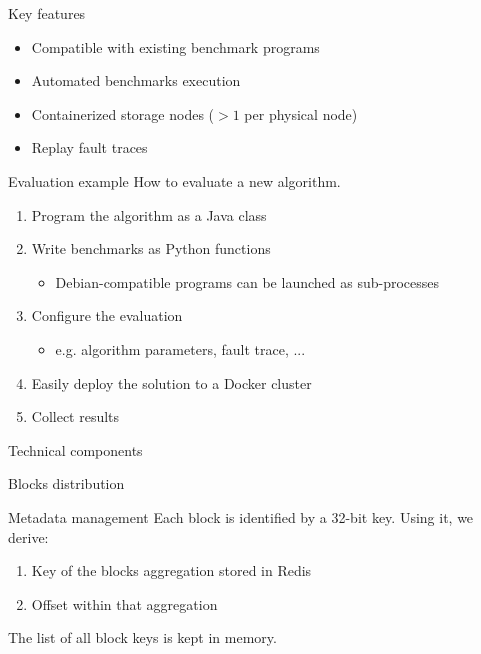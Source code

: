 \begin{frame}{Key features}
    \begin{itemize}
        \item Compatible with existing benchmark programs
        \item Automated benchmarks execution
        \item Containerized storage nodes ($>1$ per physical node)
        \item Replay fault traces
    \end{itemize}
\end{frame}

\begin{frame}{Evaluation example}
    How to evaluate a new algorithm.
    \begin{enumerate}
        \item Program the algorithm as a Java class
        \item Write benchmarks as Python functions
        \begin{itemize}
            \item Debian-compatible programs can be launched as sub-processes
        \end{itemize}
        \item Configure the evaluation
        \begin{itemize}
            \item e.g. algorithm parameters, fault trace, ...
        \end{itemize}
        \item Easily deploy the solution to a Docker cluster
        \item Collect results
    \end{enumerate}
\end{frame}

\subtitle[Architecture]{Architecture}

\begin{frame}{Technical components}
    \centering
    
\end{frame}

\begin{frame}{Blocks distribution}
    \centering
    
\end{frame}

\begin{frame}{Metadata management}
    Each block is identified by a 32-bit key.
    Using it, we derive:
    \begin{enumerate}
        \item Key of the blocks aggregation stored in Redis
        \item Offset within that aggregation
    \end{enumerate}
    
    The list of all block keys is kept in memory.
\end{frame}

